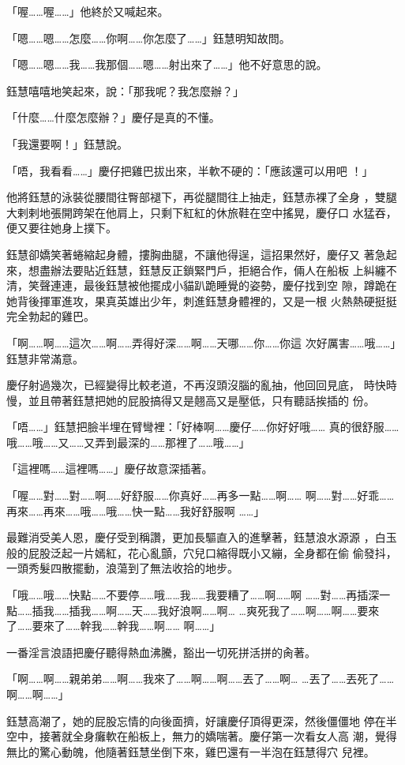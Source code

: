「喔……喔……」他終於又喊起來。

「嗯……嗯……怎麼……你啊……你怎麼了……」鈺慧明知故問。

「嗯……嗯……我……我那個……嗯……射出來了……」他不好意思的說。

鈺慧嘻嘻地笑起來，說：「那我呢？我怎麼辦？」

「什麼……什麼怎麼辦？」慶仔是真的不懂。

「我還要啊！」鈺慧說。

「唔，我看看……」慶仔把雞巴拔出來，半軟不硬的：「應該還可以用吧
！」

他將鈺慧的泳裝從腰間往臀部褪下，再從腿間往上抽走，鈺慧赤裸了全身
，雙腿大剌剌地張開跨架在他肩上，只剩下紅紅的休旅鞋在空中搖晃，慶仔口
水猛吞，便又要往她身上撲下。

鈺慧卻嬌笑著蜷縮起身體，摟胸曲腿，不讓他得逞，這招果然好，慶仔又
著急起來，想盡辦法要貼近鈺慧，鈺慧反正鎖緊門戶，拒絕合作，倆人在船板
上糾纏不清，笑聲連連，最後鈺慧被他擺成小貓趴跪睡覺的姿勢，慶仔找到空
隙，蹲跪在她背後揮軍進攻，果真英雄出少年，刺進鈺慧身體裡的，又是一根
火熱熱硬挺挺完全勃起的雞巴。

「啊……啊……這次……啊……弄得好深……啊……天哪……你……你這
次好厲害……哦……」鈺慧非常滿意。

慶仔射過幾次，已經變得比較老道，不再沒頭沒腦的亂抽，他回回見底，
時快時慢，並且帶著鈺慧把她的屁股搞得又是翹高又是壓低，只有聽話挨插的
份。

「唔……」鈺慧把臉半埋在臂彎裡：「好棒啊……慶仔……你好好哦……
真的很舒服……哦……哦……又……又弄到最深的……那裡了……哦……」

「這裡嗎……這裡嗎……」慶仔故意深插著。

「喔……對……對……啊……好舒服……你真好……再多一點……啊……
啊……對……好乖……再來……再來……哦……哦……快一點……我好舒服啊
……」

最難消受美人恩，慶仔受到稱讚，更加長驅直入的進擊著，鈺慧浪水源源
，白玉般的屁股泛起一片嫣紅，花心亂顫，穴兒口縮得既小又繃，全身都在偷
偷發抖，一頭秀髮四散擺動，浪蕩到了無法收拾的地步。

「哦……哦……快點……不要停……哦……我……我要糟了……啊……啊
……對……再插深一點……插我……插我……啊……天……我好浪啊……啊…
…爽死我了……啊……啊……要來了……要來了……幹我……幹我……啊……
啊……」

一番淫言浪語把慶仔聽得熱血沸騰，豁出一切死拼活拼的肏著。

「啊……啊……親弟弟……啊……我來了……啊……啊……丟了……啊…
…丟了……丟死了……啊……啊……」

鈺慧高潮了，她的屁股忘情的向後面擠，好讓慶仔頂得更深，然後僵僵地
停在半空中，接著就全身癱軟在船板上，無力的嬌喘著。慶仔第一次看女人高
潮，覺得無比的驚心動魄，他隨著鈺慧坐倒下來，雞巴還有一半泡在鈺慧得穴
兒裡。

